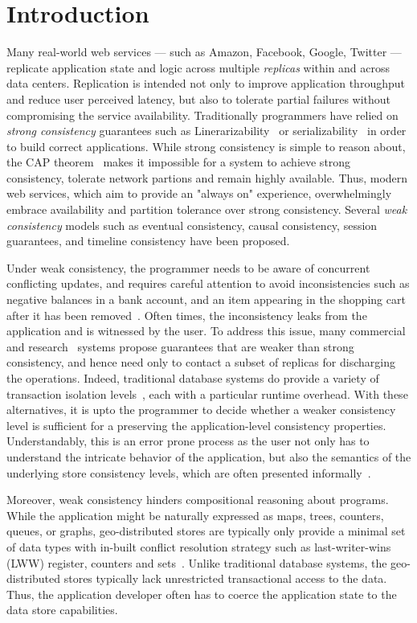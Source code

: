 \section{Introduction}

Many real-world web services --- such as Amazon, Facebook, Google, Twitter ---
replicate application state and logic across multiple \emph{replicas} within
and across data centers. Replication is intended not only to improve
application throughput and reduce user perceived latency, but also to tolerate
partial failures without compromising the service availability. Traditionally
programmers have relied on \emph{strong consistency} guarantees such as
Linerarizability~\cite{Herlihy1990} or serializability~\cite{Serializability}
in order to build correct applications. While strong consistency is simple to
reason about, the CAP theorem~\cite{Brewer2000,Gilbert} makes it impossible for
a system to achieve strong consistency, tolerate network partions and remain
highly available. Thus, modern web services, which aim to provide an "always
on" experience, overwhelmingly embrace availability and partition tolerance
over strong consistency. Several \emph{weak consistency} models such as
eventual consistency, causal consistency, session guarantees, and timeline
consistency have been proposed.

Under weak consistency, the programmer needs to be aware of concurrent
conflicting updates, and requires careful attention to avoid inconsistencies
such as negative balances in a bank account, and an item appearing in the
shopping cart after it has been removed~\cite{Dynamo}. Often times, the
inconsistency leaks from the application and is witnessed by the user. To
address this issue, many commercial~\cite{} and research~\cite{} systems
propose guarantees that are weaker than strong consistency, and hence need only
to contact a subset of replicas for discharging the operations. Indeed,
traditional database systems do provide a variety of transaction isolation
levels~\cite{}, each with a particular runtime overhead. With these
alternatives, it is upto the programmer to decide whether a weaker consistency
level is sufficient for a preserving the application-level consistency
properties. Understandably, this is an error prone process as the user not only
has to understand the intricate behavior of the application, but also the
semantics of the underlying store consistency levels, which are often presented
informally~\cite{}.

Moreover, weak consistency hinders compositional reasoning about programs.
While the application might be naturally expressed as maps, trees, counters,
queues, or graphs, geo-distributed stores are typically only provide a minimal
set of data types with in-built conflict resolution strategy such as
last-writer-wins (LWW) register, counters and sets~\cite{Cassandra,DynamoDB}.
Unlike traditional database systems, the geo-distributed stores typically lack
unrestricted transactional access to the data. Thus, the application developer
often has to coerce the application state to the data store capabilities.

